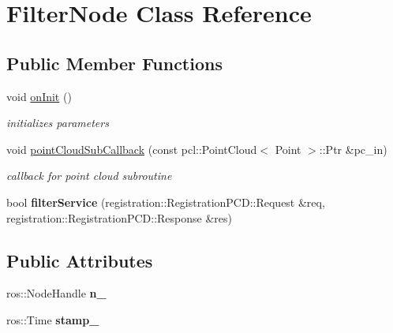 \hypertarget{classFilterNode}{
\section{FilterNode Class Reference}
\label{classFilterNode}
}
\subsection*{Public Member Functions}
\begin{DoxyCompactItemize}
\item 
void \hyperlink{classFilterNode_ad5a6037efebea20a732786f22b3d57c8}{onInit} ()
\begin{DoxyCompactList}\small\item\em initializes parameters \item\end{DoxyCompactList}\item 
void \hyperlink{classFilterNode_aa2a751b356c5e5d526176a039593c53a}{pointCloudSubCallback} (const pcl::PointCloud$<$ Point $>$::Ptr \&pc\_\-in)
\begin{DoxyCompactList}\small\item\em callback for point cloud subroutine \item\end{DoxyCompactList}\item 
\hypertarget{classFilterNode_a8c503939ad8cd17f44ac0eca14b8bb70}{
bool {\bfseries filterService} (registration::RegistrationPCD::Request \&req, registration::RegistrationPCD::Response \&res)}
\label{classFilterNode_a8c503939ad8cd17f44ac0eca14b8bb70}

\end{DoxyCompactItemize}
\subsection*{Public Attributes}
\begin{DoxyCompactItemize}
\item 
\hypertarget{classFilterNode_a25e814d44b3b82d31110b5d38ebae9ab}{
ros::NodeHandle {\bfseries n\_\-}}
\label{classFilterNode_a25e814d44b3b82d31110b5d38ebae9ab}

\item 
\hypertarget{classFilterNode_a534f1ee93b0ef514ba610077791b8bdf}{
ros::Time {\bfseries stamp\_\-}}
\label{classFilterNode_a534f1ee93b0ef514ba610077791b8bdf}

\end{DoxyCompactItemize}
